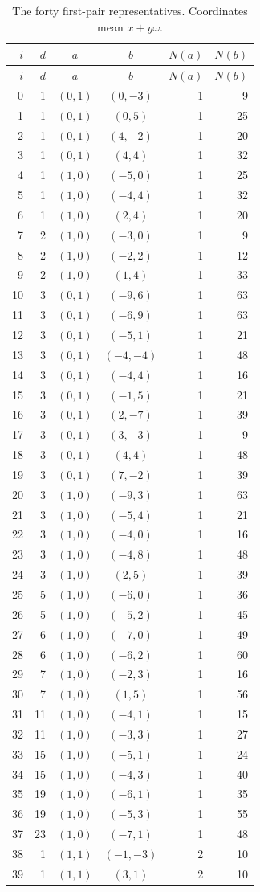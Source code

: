 \documentclass[12pt]{article}
\numberwithin{equation}{section}
\begin{document}
\begingroup\small
\setlength{\tabcolsep}{5pt}
\begin{longtable}{r|r|c|c|r|r}
\caption{The forty first-pair representatives. Coordinates mean $x+y\omega$.}\label{tab:pr-forty-pairs}\\
$i$&$d$&$a$&$b$&$N(a)$&$N(b)$\\\hline\endfirsthead
$i$&$d$&$a$&$b$&$N(a)$&$N(b)$\\\hline\endhead
0&1&$(0,1)$&$(0,-3)$&1&9\\
1&1&$(0,1)$&$(0,5)$&1&25\\
2&1&$(0,1)$&$(4,-2)$&1&20\\
3&1&$(0,1)$&$(4,4)$&1&32\\
4&1&$(1,0)$&$(-5,0)$&1&25\\
5&1&$(1,0)$&$(-4,4)$&1&32\\
6&1&$(1,0)$&$(2,4)$&1&20\\
7&2&$(1,0)$&$(-3,0)$&1&9\\
8&2&$(1,0)$&$(-2,2)$&1&12\\
9&2&$(1,0)$&$(1,4)$&1&33\\
10&3&$(0,1)$&$(-9,6)$&1&63\\
11&3&$(0,1)$&$(-6,9)$&1&63\\
12&3&$(0,1)$&$(-5,1)$&1&21\\
13&3&$(0,1)$&$(-4,-4)$&1&48\\
14&3&$(0,1)$&$(-4,4)$&1&16\\
15&3&$(0,1)$&$(-1,5)$&1&21\\
16&3&$(0,1)$&$(2,-7)$&1&39\\
17&3&$(0,1)$&$(3,-3)$&1&9\\
18&3&$(0,1)$&$(4,4)$&1&48\\
19&3&$(0,1)$&$(7,-2)$&1&39\\
20&3&$(1,0)$&$(-9,3)$&1&63\\
21&3&$(1,0)$&$(-5,4)$&1&21\\
22&3&$(1,0)$&$(-4,0)$&1&16\\
23&3&$(1,0)$&$(-4,8)$&1&48\\
24&3&$(1,0)$&$(2,5)$&1&39\\
25&5&$(1,0)$&$(-6,0)$&1&36\\
26&5&$(1,0)$&$(-5,2)$&1&45\\
27&6&$(1,0)$&$(-7,0)$&1&49\\
28&6&$(1,0)$&$(-6,2)$&1&60\\
29&7&$(1,0)$&$(-2,3)$&1&16\\
30&7&$(1,0)$&$(1,5)$&1&56\\
31&11&$(1,0)$&$(-4,1)$&1&15\\
32&11&$(1,0)$&$(-3,3)$&1&27\\
33&15&$(1,0)$&$(-5,1)$&1&24\\
34&15&$(1,0)$&$(-4,3)$&1&40\\
35&19&$(1,0)$&$(-6,1)$&1&35\\
36&19&$(1,0)$&$(-5,3)$&1&55\\
37&23&$(1,0)$&$(-7,1)$&1&48\\
38&1&$(1,1)$&$(-1,-3)$&2&10\\
39&1&$(1,1)$&$(3,1)$&2&10\\
\end{longtable}
\end{document}
